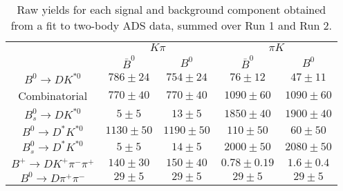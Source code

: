 \begin{table}
  \centering
  \begin{tabular}{ccccc}
      \toprule
       & \multicolumn{2}{c}{$K\pi$} & \multicolumn{2}{c}{$\pi K$} \\
      & $\bar{B}^0$ & $B^0$& $\bar{B}^0$ & $B^0$ \\
      \midrule
      $B^0 \to DK^{*0}$ & $786 \pm 24$ & $754 \pm 24$ & $76 \pm 12$ & $47 \pm 11$ \\
      Combinatorial & $770 \pm 40$ & $770 \pm 40$ & $1090 \pm 60$ & $1090 \pm 60$ \\
      $B^0_s \to DK^{*0}$ & $5 \pm 5$ & $13 \pm 5$ & $1850 \pm 40$ & $1900 \pm 40$ \\
      $B^0 \to D^*K^{*0}$ & $1130 \pm 50$ & $1190 \pm 50$ & $110 \pm 50$ & $60 \pm 50$ \\
      $B^0_s \to D^*K^{*0}$ & $5 \pm 5$ & $14 \pm 5$ & $2000 \pm 50$ & $2080 \pm 50$ \\
      $B^+ \to DK^+\pi^-\pi^+$ & $140 \pm 30$ & $150 \pm 40$ & $0.78 \pm 0.19$ & $1.6 \pm 0.4$ \\
      $B^0 \to D\pi^+\pi^-$ & $29 \pm 5$ & $29 \pm 5$ & $29 \pm 5$ & $29 \pm 5$ \\
      \bottomrule
      \end{tabular}
\caption{Raw yields for each signal and background component obtained from a fit to two-body ADS data, summed over Run 1 and Run 2.}
\label{tab:yields_split_2body_ADS}
\end{table}
